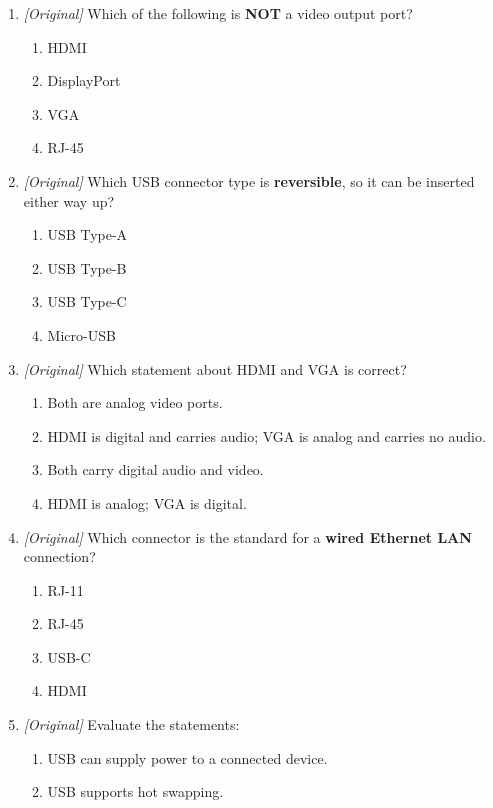\begin{enumerate}[label=\textbf{Q\arabic*.}, leftmargin=*]
\begin{enumerate}[label=\Alph*.]
    \item Serial Advanced Transfer Array
  \end{enumerate}
\item \textit{[Original]} Which of the following is \textbf{NOT} a video
  output port?
  \begin{enumerate}[label=\Alph*.]
    \item HDMI
    \item DisplayPort
    \item VGA
    \item RJ-45
  \end{enumerate}
\item \textit{[Original]} Which USB connector type is \textbf{reversible},
  so it can be inserted either way up?
  \begin{enumerate}[label=\Alph*.]
    \item USB Type-A
    \item USB Type-B
    \item USB Type-C
    \item Micro-USB
  \end{enumerate}
\item \textit{[Original]} Which statement about HDMI and VGA is correct?
  \begin{enumerate}[label=\Alph*.]
    \item Both are analog video ports.
    \item HDMI is digital and carries audio; VGA is analog and carries no
      audio.
    \item Both carry digital audio and video.
    \item HDMI is analog; VGA is digital.
  \end{enumerate}
\item \textit{[Original]} Which connector is the standard for a \textbf{wired
  Ethernet LAN} connection?
  \begin{enumerate}[label=\Alph*.]
    \item RJ-11
    \item RJ-45
    \item USB-C
    \item HDMI
  \end{enumerate}
\item \textit{[Original]} Evaluate the statements:
  \begin{enumerate}[label=\Roman*.]
    \item USB can supply power to a connected device.
    \item USB supports hot swapping.

\end{enumerate}
\end{enumerate}
